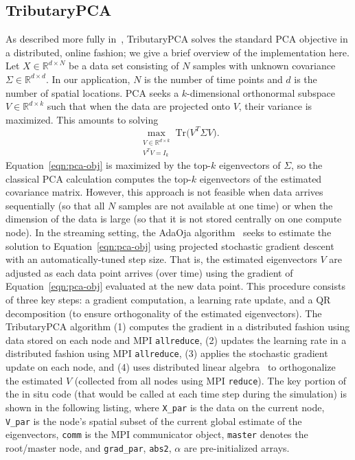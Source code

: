\documentclass{juliacon}
\begin{document}
\subsection{TributaryPCA} 
As described more fully in~\cite{wang2021tributarypca}, TributaryPCA solves the standard PCA objective in a distributed, online fashion; we give a brief overview of the implementation here.
Let $X \in \mathbb{R}^{d \times N}$ be a data set consisting of $N$ samples with unknown covariance $\Sigma \in \mathbb{R}^{d \times d}$. 
In our application, $N$ is the number of time points and $d$ is the number of spatial locations.
PCA seeks a $k$-dimensional orthonormal subspace $V \in \mathbb{R}^{d \times k}$ such that when the data are projected onto $V$, their variance is maximized. This amounts to solving 
\begin{equation}\label{eqn:pca-obj}
    \max_{\substack{V \in \mathbb{R}^{d \times k} \\ V^TV = I_k}} \text{Tr}\Big(V^T \Sigma V\Big).
\end{equation}
Equation~\eqref{eqn:pca-obj} is maximized by the top-$k$ eigenvectors of $\Sigma$, so the classical PCA calculation computes the top-$k$ eigenvectors of the estimated covariance matrix.
However, this approach is not feasible when data arrives sequentially (so that all $N$ samples are not available at one time) or when the dimension of the data is large (so that it is not stored centrally on one compute node).
In the streaming setting, the AdaOja algorithm~\cite{henriksen2019adaoja} seeks to estimate the solution to Equation~\eqref{eqn:pca-obj} using projected stochastic gradient descent with an automatically-tuned step size.
That is, the estimated eigenvectors $V$ are adjusted as each data point arrives (over time) using the gradient of Equation~\eqref{eqn:pca-obj} evaluated at the new data point.
This procedure consists of three key steps: a gradient computation, a learning rate update, and a QR decomposition (to ensure orthogonality of the estimated eigenvectors).
The TributaryPCA algorithm (1) computes the gradient in a distributed fashion using data stored on each node and MPI \texttt{allreduce}, (2) updates the learning rate in a distributed fashion using MPI \texttt{allreduce}, (3) applies the stochastic gradient update on each node, and (4) uses distributed linear algebra~\cite{demmel2012communication} to orthogonalize the estimated $V$ (collected from all nodes using MPI \texttt{reduce}).
The key portion of the in situ code (that would be called at each time step during the simulation) is shown in the following listing, where \texttt{X\_par} is the data on the current node, \texttt{V\_par} is the node's spatial subset of the current global estimate of the eigenvectors, \texttt{comm} is the MPI communicator object, \texttt{master} denotes the root/master node, and \texttt{grad\_par}, \texttt{abs2}, $\alpha$ are pre-initialized arrays.
\end{document}
